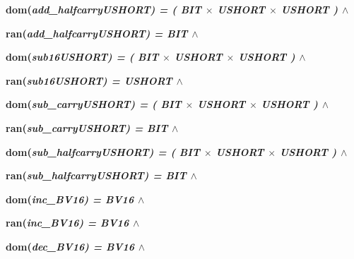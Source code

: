 \documentclass[11pt]{article}
\begin{document}
\begin{sloppypar}
\hspace*{0.20in}

\hspace*{0.20in}

\hspace*{0.20in}\bf dom\rm (\it add\_halfcarryUSHORT\rm ) \rm = \rm ( \it BIT  $\times$  \it USHORT  $\times$  \it USHORT \rm )  $\land$ 

\hspace*{0.20in}\bf ran\rm (\it add\_halfcarryUSHORT\rm ) \rm = \it BIT  $\land$ 

\hspace*{0.20in}

\hspace*{0.20in}

\hspace*{0.20in}\bf dom\rm (\it sub16USHORT\rm ) \rm = \rm ( \it BIT  $\times$  \it USHORT  $\times$  \it USHORT \rm )  $\land$ 

\hspace*{0.20in}\bf ran\rm (\it sub16USHORT\rm ) \rm = \it USHORT  $\land$ 

\hspace*{0.20in}

\hspace*{0.20in}\bf dom\rm (\it sub\_carryUSHORT\rm ) \rm = \rm ( \it BIT  $\times$  \it USHORT  $\times$  \it USHORT \rm )  $\land$ 

\hspace*{0.20in}\bf ran\rm (\it sub\_carryUSHORT\rm ) \rm = \it BIT  $\land$ 

\hspace*{0.20in}

\hspace*{0.20in}\bf dom\rm (\it sub\_halfcarryUSHORT\rm ) \rm = \rm ( \it BIT  $\times$  \it USHORT  $\times$  \it USHORT \rm )  $\land$ 

\hspace*{0.20in}\bf ran\rm (\it sub\_halfcarryUSHORT\rm ) \rm = \it BIT  $\land$ 

\hspace*{0.20in}

\hspace*{0.20in}\bf dom\rm (\it inc\_BV16\rm ) \rm = \it BV16  $\land$ 

\hspace*{0.20in}\bf ran\rm (\it inc\_BV16\rm ) \rm = \it BV16  $\land$ 

\hspace*{0.20in}

\hspace*{0.20in}\bf dom\rm (\it dec\_BV16\rm ) \rm = \it BV16  $\land$ 


\end{sloppypar}
\end{document}

